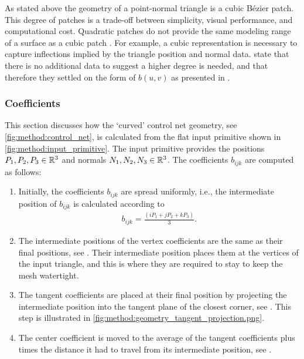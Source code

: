 	As stated above the geometry of a point-normal triangle is a cubic Bézier patch. This degree of patches is a trade-off between simplicity, visual performance, and computational cost. Quadratic patches do not provide the same modeling range of a surface as a cubic patch \cite{boubekeur2008phong}. For example, a cubic representation is necessary to capture inflections implied by the triangle position and normal data. \citeauthor{vlachos2001curved} state that there is no additional data to suggest a higher degree is needed, and that therefore they settled on the form of $b(u,v)$ as presented in .

\subsubsection{Coefficients} 
\label{sss:method:geometry:construction}
	This section discusses how the `curved' control net geometry, see \cref{fig:method:control_net}, is calculated from the flat input primitive shown in \cref{fig:method:input_primitive}. The input primitive provides the positions $P_1, P_2, P_3 \in \mathbb{R}^3$ and normals $N_1, N_2, N_3 \in \mathbb{R}^3$. The coefficients $b_{ijk}$ are computed as follows:
	\begin{enumerate}[label=(\roman*)]
		\item 
			Initially, the coefficients $b_{ijk}$ are spread uniformly, i.e., the intermediate position of $b_{ijk}$ is calculated according to
			\begin{align*}
				b_{ijk} = \frac{(i P_1 + j P_2 + k P_3)}{3}.
			\end{align*}
		\item 
			The intermediate positions of the vertex coefficients are the same as their final positions, see . Their intermediate position places them at the vertices of the input triangle, and this is where they are required to stay to keep the mesh watertight.
		\item 
			The tangent coefficients are placed at their final position by projecting the intermediate position into the tangent plane of the closest corner, see . This step is illustrated in \cref{fig:method:geometry_tangent_projection.png}.
		\item The center coefficient is moved to the average of the tangent coefficients plus  times the distance it had to travel from its intermediate position, see .
	\end{enumerate}
